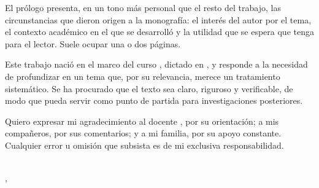 
El prólogo presenta, en un tono más personal que el resto del trabajo, las
circunstancias que dieron origen a la monografía: el interés del autor por el
tema, el contexto académico en el que se desarrolló y la utilidad que se espera
que tenga para el lector. Suele ocupar una o dos páginas.

Este trabajo nació en el marco del curso \emph{\monoCurso}, dictado en
\monoUniversidad, y responde a la necesidad de profundizar en un tema que, por
su relevancia, merece un tratamiento sistemático. Se ha procurado que el texto
sea claro, riguroso y verificable, de modo que pueda servir como punto de
partida para investigaciones posteriores.

Quiero expresar mi agradecimiento al docente \monoDocente, por su orientación;
a mis compañeros, por sus comentarios; y a mi familia, por su apoyo constante.
Cualquier error u omisión que subsista es de mi exclusiva responsabilidad.

\vspace{1cm}
\begin{flushright}
  \monoAutor\\
  \monoCiudad, \monoAnio
\end{flushright}
